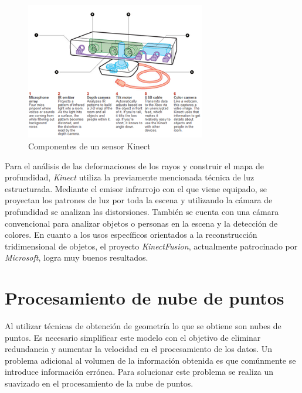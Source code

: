 \begin{figure}[H]
  \centering
    \includegraphics[width=0.7\textwidth]{./Cap6_reconstruccion/kinect.PNG}
  \caption{Componentes de un sensor Kinect}
  \label{fig:Kinect}
\end{figure}

Para el análisis de las deformaciones de los rayos y construir el mapa de profundidad, \emph{Kinect} utiliza la previamente mencionada técnica de luz estructurada. Mediante el emisor infrarrojo con el que viene equipado, se proyectan los patrones de luz por toda la escena y utilizando la cámara de profundidad se analizan las distorsiones.
También se cuenta con una cámara convencional para analizar objetos o personas en la escena y la detección de colores.
En cuanto a los usos específicos orientados a la reconstrucción tridimensional de objetos, el proyecto \emph{KinectFusion}\cite{KinectFusion}, actualmente patrocinado por \emph{Microsoft}, logra muy buenos resultados.%

\section{Procesamiento de nube de puntos}

Al utilizar técnicas de obtención de geometría lo que se obtiene son nubes de puntos. Es necesario simplificar este modelo con el objetivo de eliminar redundancia y aumentar la velocidad en el procesamiento de los datos. Un problema adicional al volumen de la información obtenida es que comúnmente se introduce información errónea. Para solucionar este problema se realiza un suavizado en el procesamiento de la nube de puntos\cite{PCloudSimplify}.

